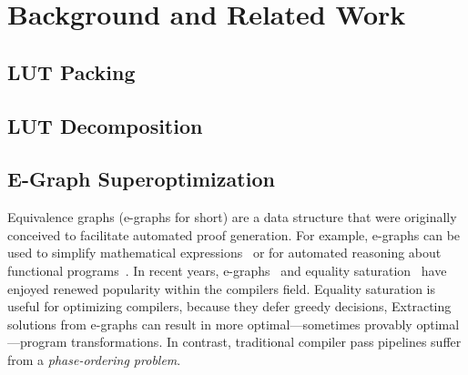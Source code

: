 \section{Background and Related Work}\label{sec:relatedwork}

\subsection{LUT Packing}\label{sec:relatedwork:packing}

\subsection{LUT Decomposition}\label{sec:relatedwork:decomp}

\subsection{E-Graph Superoptimization}\label{sec:relatedwork:egraph}
Equivalence graphs (e-graphs for short) are a data structure that were
originally conceived to facilitate automated proof generation. For example,
e-graphs can be used to simplify mathematical expressions~\cite{egraphmath} or
for automated reasoning about functional programs~\cite{cclemma}. In recent
years, e-graphs~\cite{eggpaper} and equality saturation~\cite{eqsat} have
enjoyed renewed popularity within the compilers field. Equality saturation is
useful for optimizing compilers, because they defer greedy decisions,
Extracting solutions from e-graphs can result in more optimal---sometimes
provably optimal---program transformations. In contrast, traditional compiler
pass pipelines suffer from a \textit{phase-ordering problem}.
